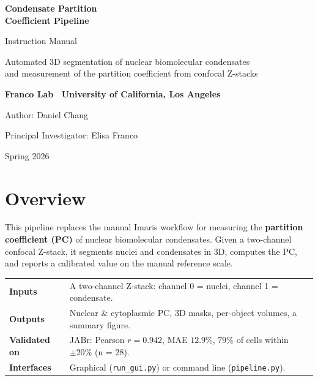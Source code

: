 \documentclass[11pt]{article}
\newcommand{\code}[1]{\texttt{\small #1}}
\begin{document}
\begin{titlepage}
\centering
\vspace*{3cm}
{\color{accent}\Huge\bfseries Condensate Partition\\[0.3em] Coefficient Pipeline\par}
\vspace{1cm}
{\Large Instruction Manual\par}
\vspace{2cm}
{\large Automated 3D segmentation of nuclear biomolecular condensates\\
and measurement of the partition coefficient from confocal Z-stacks\par}
\vfill
{\large\bfseries Franco Lab \textbullet\ University of California, Los Angeles\par}
\vspace{0.4cm}
{\large Author: Daniel Chang\par}
{\large Principal Investigator: Elisa Franco\par}
\vspace{0.8cm}
{\color{muted}Spring 2026\par}
\end{titlepage}

\tableofcontents
\newpage

\section{Overview}
This pipeline replaces the manual Imaris workflow for measuring the
\textbf{partition coefficient (PC)} of nuclear biomolecular condensates. Given a
two-channel confocal Z-stack, it segments nuclei and condensates in 3D, computes
the PC, and reports a calibrated value on the manual reference scale.

\begin{center}
\begin{tabular}{>{\raggedright}p{3.2cm} p{10cm}}
\toprule
\textbf{Inputs} & A two-channel Z-stack: channel 0 = nuclei, channel 1 = condensate.\\
\textbf{Outputs} & Nuclear \& cytoplasmic PC, 3D masks, per-object volumes, a summary figure.\\
\textbf{Validated on} & JABr: Pearson $r = 0.942$, MAE $12.9\%$, $79\%$ of cells within $\pm 20\%$ (n = 28).\\
\textbf{Interfaces} & Graphical (\code{run\_gui.py}) or command line (\code{pipeline.py}).\\
\bottomrule
\end{tabular}
\end{center}
\end{document}
